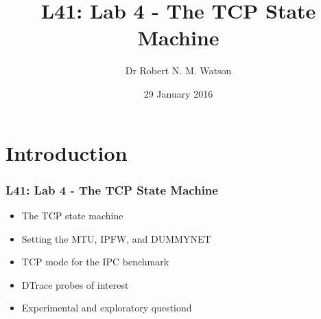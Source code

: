 
{
}

\usepackage[english]{babel}
\usepackage[latin1]{inputenc}
\usepackage{graphicx}
\usepackage{times}
\usepackage[T1]{fontenc}
\usepackage{fancyvrb}
\usepackage{hyperref}
\usepackage{listings}


\def\Tiny{\fontsize{4pt}{4pt} \selectfont}

\title{L41: Lab 4 - The TCP State Machine}
\author{Dr Robert N. M. Watson}
\date{29 January 2016}

\begin{frame}
  \titlepage
\end{frame}

\section{Introduction}

\begin{frame}
  \frametitle{L41: Lab 4 - The TCP State Machine}

  \begin{itemize}
    \item The TCP state machine
    \item Setting the MTU, IPFW, and DUMMYNET
    \item TCP mode for the IPC benchmark
    \item DTrace probes of interest
    \item Experimental and exploratory questiond
  \end{itemize}
\end{frame}

